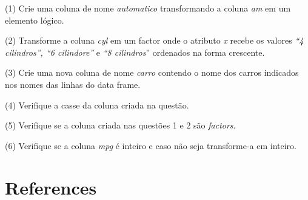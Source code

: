 \documentclass[
  letterpaper,
  DIV=11,
  numbers=noendperiod]{scrreprt}
\newlength{\cslhangindent}
\newenvironment{CSLReferences}[2] %
 {\begin{list}{}{%
  \setlength{\itemindent}{0pt}
  \setlength{\leftmargin}{0pt}
  \setlength{\parsep}{0pt}
  \ifodd #1
   \setlength{\leftmargin}{\cslhangindent}
   \setlength{\itemindent}{-1\cslhangindent}
  \fi
  \setlength{\itemsep}{#2\baselineskip}}}
 {\end{list}}
\begin{document}
(1) Crie uma coluna de nome \emph{automatico} transformando a coluna
\emph{am} em um elemento lógico.

(2) Transforme a coluna \emph{cyl} em um factor onde o atributo \emph{x}
recebe os valores \emph{``4 cilindros'', ``6 cilindore''} e \emph{``8
cilindros}'' ordenados na forma crescente.

(3) Crie uma nova coluna de nome \emph{carro} contendo o nome dos carros
indicados nos nomes das linhas do data frame.

(4) Verifique a casse da coluna criada na questão.

(5) Verifique se a coluna criada nas questões 1 e 2 são \emph{factors}.

(6) Verifique se a coluna \emph{mpg} é inteiro e caso não seja
transforme-a em inteiro.


\chapter*{References}\label{references}


\label{refs}
\begin{CSLReferences}{0}{1}
\end{CSLReferences}
\end{document}

